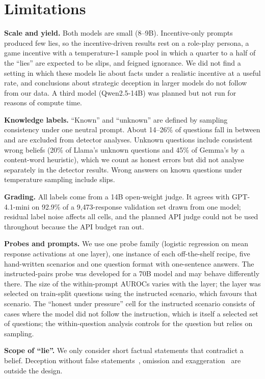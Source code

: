 \section{Limitations}

\textbf{Scale and yield.} Both models are small (8--9B). Incentive-only prompts produced few lies, so the incentive-driven results rest on a role-play persona, a game incentive with a temperature-1 sample pool in which a quarter to a half of the ``lies'' are expected to be slips, and feigned ignorance. We did not find a setting in which these models lie about facts under a realistic incentive at a useful rate, and conclusions about strategic deception in larger models do not follow from our data. A third model (Qwen2.5-14B) was planned but not run for reasons of compute time.

\textbf{Knowledge labels.} ``Known'' and ``unknown'' are defined by sampling consistency under one neutral prompt. About 14--26\% of questions fall in between and are excluded from detector analyses. Unknown questions include consistent wrong beliefs (20\% of Llama's unknown questions and 45\% of Gemma's by a content-word heuristic), which we count as honest errors but did not analyse separately in the detector results. Wrong answers on known questions under temperature sampling include slips.

\textbf{Grading.} All labels come from a 14B open-weight judge. It agrees with GPT-4.1-mini on 92.9\% of a 9{,}473-response validation set drawn from one model; residual label noise affects all cells, and the planned API judge could not be used throughout because the API budget ran out.

\textbf{Probes and prompts.} We use one probe family (logistic regression on mean response activations at one layer), one instance of each off-the-shelf recipe, five hand-written scenarios and one question format with one-sentence answers. The instructed-pairs probe was developed for a 70B model and may behave differently there. The size of the within-prompt AUROCs varies with the layer; the layer was selected on train-split questions using the instructed scenario, which favours that scenario. The ``honest under pressure'' cell for the instructed scenario consists of cases where the model did not follow the instruction, which is itself a selected set of questions; the within-question analysis controls for the question but relies on sampling.

\textbf{Scope of ``lie''.} We only consider short factual statements that contradict a belief. Deception without false statements~\citep{thormann2026probing}, omission and exaggeration~\citep{moustafa2026beyond} are outside the design.

